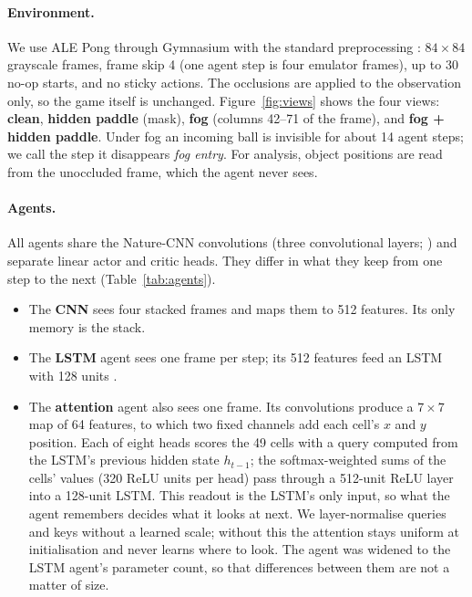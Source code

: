 \documentclass[11pt]{article}
\begin{document}
\paragraph{Environment.} We use ALE Pong \citep{bellemare2013ale} through Gymnasium with the standard
preprocessing \citep{machado2018revisiting}: $84\times84$ grayscale frames, frame skip 4 (one agent step is
four emulator frames), up to 30 no-op starts, and no sticky actions. The occlusions are applied to the
observation only, so the game itself is unchanged. Figure~\ref{fig:views} shows the four views:
\textbf{clean}, \textbf{hidden paddle} (mask), \textbf{fog} (columns 42--71 of the frame), and \textbf{fog +
hidden paddle}. Under fog an incoming ball is invisible for about 14 agent steps; we call the step it
disappears \emph{fog entry}. For analysis, object positions are read from the unoccluded frame, which the
agent never sees.

\paragraph{Agents.} All agents share the Nature-CNN convolutions (three convolutional layers;
\citep{mnih2015human}) and separate linear actor and critic heads. They differ in what they keep from one
step to the next (Table~\ref{tab:agents}).
\begin{itemize}
  \item The \textbf{CNN} sees four stacked frames and maps them to 512 features. Its only memory is the stack.
  \item The \textbf{LSTM} agent sees one frame per step; its 512 features feed an LSTM with 128 units
    \citep{hochreiter1997lstm}.
  \item The \textbf{attention} agent also sees one frame. Its convolutions produce a $7\times7$ map of 64
    features, to which two fixed channels add each cell's $x$ and $y$ position. Each of eight heads scores
    the 49 cells with a query computed from the LSTM's previous hidden state $h_{t-1}$; the softmax-weighted
    sums of the cells' values (320 ReLU units per head) pass through a 512-unit ReLU layer into a 128-unit
    LSTM. This readout is the LSTM's only input, so what the agent remembers decides what it looks at next.
    We layer-normalise queries and keys without a learned scale; without this the attention stays uniform at
    initialisation and never learns where to look. The agent was widened to the LSTM agent's parameter count,
    so that differences between them are not a matter of size.
\end{itemize}
\end{document}
